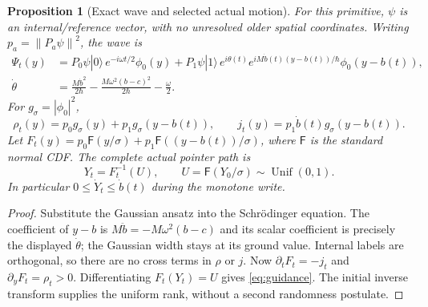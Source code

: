 \documentclass[11pt]{article}
\newtheorem{proposition}[theorem]{Proposition}
\theoremstyle{definition}\newtheorem{assumption}[theorem]{Constitutive assumption}
\theoremstyle{remark}\newtheorem{remark}[theorem]{Remark}
\newcommand{\ket}[1]{|#1\rangle}\newcommand{\bra}[1]{\langle#1|}
\newcommand{\norm}[1]{\left\|#1\right\|}\newcommand{\pos}[1]{[#1]_+}
\newcommand{\Ncdf}{\mathsf F}\newcommand{\Ntail}{\overline{\mathsf F}}
\begin{document}
\begin{proposition}[Exact wave and selected actual motion]\label{prop:writer}
For this primitive, $\psi$ is an internal/reference vector, with no unresolved older spatial coordinates. Writing $p_a=\norm{P_a\psi}^2$, the wave is
\begin{align}\label{eq:packet}
 \Psi_t(y)&=P_0\psi\ket0\,e^{-i\omega t/2}\phi_0(y)
 +P_1\psi\ket1\,e^{i\theta(t)}e^{iM\dot b(t)(y-b(t))/\hbar}\phi_0(y-b(t)),\\
 \dot\theta&=\frac{M\dot b^2}{2\hbar}-\frac{M\omega^2(b-c)^2}{2\hbar}-\frac\omega2.\nonumber
\end{align}
For $g_\sigma=|\phi_0|^2$,
\begin{equation}\label{eq:mixture}
 \rho_t(y)=p_0g_\sigma(y)+p_1g_\sigma(y-b(t)),\qquad
 j_t(y)=p_1\dot b(t)g_\sigma(y-b(t)).
\end{equation}
Let $F_t(y)=p_0\Ncdf(y/\sigma)+p_1\Ncdf((y-b(t))/\sigma)$, where $\Ncdf$ is the standard normal CDF. The complete actual pointer path is
\begin{equation}\label{eq:quantile}
 Y_t=F_t^{-1}(U),\qquad U=\Ncdf(Y_0/\sigma)\sim\operatorname{Unif}(0,1).
\end{equation}
In particular $0\le\dot Y_t\le\dot b(t)$ during the monotone write.
\end{proposition}
\begin{proof}
Substitute the Gaussian ansatz into the Schr\"odinger equation. The coefficient of $y-b$ is $M\ddot b=-M\omega^2(b-c)$ and its scalar coefficient is precisely the displayed $\dot\theta$; the Gaussian width stays at its ground value. Internal labels are orthogonal, so there are no cross terms in $\rho$ or $j$. Now $\partial_tF_t=-j_t$ and $\partial_yF_t=\rho_t>0$. Differentiating $F_t(Y_t)=U$ gives \eqref{eq:guidance}. The initial inverse transform supplies the uniform rank, without a second randomness postulate.
\end{proof}
\end{document}
